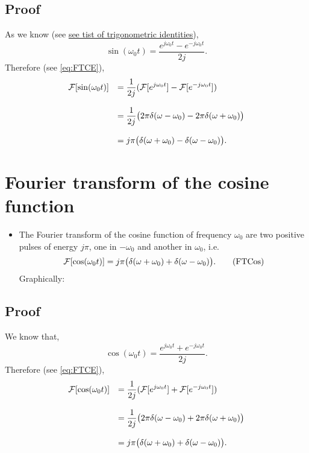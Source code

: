 \subsection*{Proof}
\noindent As we know (see
\href{https://en.wikipedia.org/wiki/List_of_trigonometric_identities#Relation_to_the_complex_exponential_function}{see
  tist of trigonometric identities}),
\begin{equation*}
  \sin(\omega_0t) = \frac{\displaystyle e^{j\omega_0t}-e^{-j\omega_0t}}{\displaystyle 2j}.
\end{equation*}
Therefore (see \ref{eq:FTCE}),
\begin{equation*}
  \begin{array}{rl}
    {\cal F}[\sin(\omega_0t)] & = \displaystyle\frac{1}{2j}({\cal
      F}[e^{j\omega_0t}]-{\cal F}[e^{-j\omega_0t}])\\\\
    & = \displaystyle\frac{1}{2j}\big(2\pi\delta(\omega-\omega_0)-2\pi\delta(\omega+\omega_0)\big)\\\\
    & = j\pi\big(\delta(\omega+\omega_0)-\delta(\omega-\omega_0)\big).
  \end{array}
\end{equation*}

\section{Fourier transform of the cosine function}
\begin{itemize}
\item The Fourier transform of the cosine function of frequency $\omega_0$
  are two positive pulses of energy $j\pi$, one in $-\omega_0$ and another
  in $\omega_0$, i.e.
  \begin{equation}
    {\cal F}[\cos(\omega_0t)] = j\pi\big(\delta(\omega+\omega_0)+\delta(\omega-\omega_0)\big).
    \tag{FTCos}
    \label{eq:FtCos}
  \end{equation}
  Graphically:
\end{itemize}

\subsection*{Proof}
\noindent We know that,
\begin{equation}
  \cos(\omega_0t) = \frac{\displaystyle e^{j\omega_0t}+e^{-j\omega_0t}}{\displaystyle 2j}.
\end{equation}
Therefore (see \ref{eq:FTCE}),
\begin{equation*}
  \begin{array}{rl}
    {\cal F}[\cos(\omega_0t)] & = \displaystyle\frac{1}{2j}({\cal
      F}[e^{j\omega_0t}]+{\cal F}[e^{-j\omega_0t}])\\\\
    & = \displaystyle\frac{1}{2j}\big(2\pi\delta(\omega-\omega_0)+2\pi\delta(\omega+\omega_0)\big)\\\\
    & = j\pi\big(\delta(\omega+\omega_0)+\delta(\omega-\omega_0)\big).
  \end{array}
\end{equation*}

